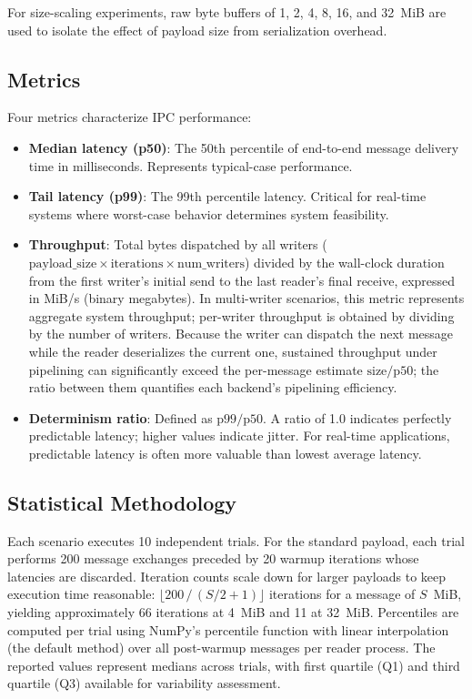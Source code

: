 For size-scaling experiments, raw byte buffers of 1, 2, 4, 8, 16, and 32~MiB are used to isolate the effect of payload size from serialization overhead.

\newpage
\subsection{Metrics}

Four metrics characterize IPC performance:

\begin{itemize}
    \item \textbf{Median latency (p50)}: The 50th percentile of end-to-end message delivery time in milliseconds. Represents typical-case performance.

    \item \textbf{Tail latency (p99)}: The 99th percentile latency. Critical for real-time systems where worst-case behavior determines system feasibility.

    \item \textbf{Throughput}: Total bytes dispatched by all writers ($\text{payload\_size} \times \text{iterations} \times \text{num\_writers}$) divided by the wall-clock duration from the first writer's initial send to the last reader's final receive, expressed in MiB/s (binary megabytes). In multi-writer scenarios, this metric represents aggregate system throughput; per-writer throughput is obtained by dividing by the number of writers. Because the writer can dispatch the next message while the reader deserializes the current one, sustained throughput under pipelining can significantly exceed the per-message estimate $\text{size} / \text{p50}$; the ratio between them quantifies each backend's pipelining efficiency.

    \item \textbf{Determinism ratio}: Defined as $\text{p99} / \text{p50}$. A ratio of 1.0 indicates perfectly predictable latency; higher values indicate jitter. For real-time applications, predictable latency is often more valuable than lowest average latency.
\end{itemize}

\subsection{Statistical Methodology}

Each scenario executes 10 independent trials. For the standard payload, each trial performs 200 message exchanges preceded by 20 warmup iterations whose latencies are discarded. Iteration counts scale down for larger payloads to keep execution time reasonable: $\lfloor 200 \,/\, (S / 2 + 1) \rfloor$ iterations for a message of $S$~MiB, yielding approximately 66 iterations at 4~MiB and 11 at 32~MiB. Percentiles are computed per trial using NumPy's percentile function with linear interpolation (the default method) over all post-warmup messages per reader process. The reported values represent medians across trials, with first quartile (Q1) and third quartile (Q3) available for variability assessment.

